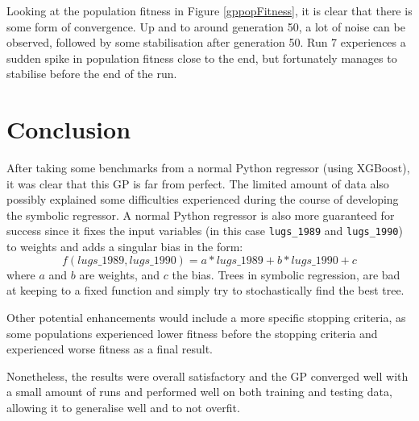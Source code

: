 \documentclass{article}
\begin{document}
Looking at the population fitness in Figure \ref{gppopFitness}, it is clear that there is some form of convergence. Up and to around generation 50, a lot of noise can be observed, followed by some stabilisation after generation 50. Run 7 experiences a sudden spike in population fitness close to the end, but fortunately manages to stabilise before the end of the run.

\section{Conclusion}
After taking some benchmarks from a normal Python regressor (using XGBoost), it was clear that this GP is far from perfect. The limited amount of data also possibly explained some difficulties experienced during the course of developing the symbolic regressor. A normal Python regressor is also more guaranteed for success since it fixes the input variables (in this case \texttt{lugs\_1989} and \texttt{lugs\_1990}) to weights and adds a singular bias in the form:
\[f(lugs\_1989, lugs\_1990) = a * lugs\_1989 + b * lugs\_1990 + c\]
where \(a\) and \(b\) are weights, and \(c\) the bias.
Trees in symbolic regression, are bad at keeping to a fixed function and simply try to stochastically find the best tree.

Other potential enhancements would include a more specific stopping criteria, as some populations experienced lower fitness before the stopping criteria and experienced worse fitness as a final result.

Nonetheless, the results were overall satisfactory and the GP converged well with a small amount of runs and performed well on both training and testing data, allowing it to generalise well and to not overfit.
\end{document}
